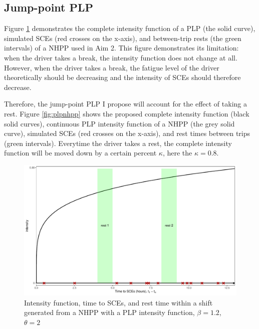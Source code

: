 \documentclass[12pt]{book}
\numberwithin{equation}{chapter}
\begin{document}
\hypertarget{jump-point-plp}{%
\subsection{Jump-point PLP}\label{jump-point-plp}}

Figure \ref{fig:plpjumppoint} demonstrates the complete intensity function of a PLP (the solid curve), simulated SCEs (red crosses on the x-axis), and between-trip rests (the green intervals) of a NHPP used in Aim 2. This figure demonstrates its limitation: when the driver takes a break, the intensity function does not change at all. However, when the driver takes a break, the fatigue level of the driver theoretically should be decreasing and the intensity of SCEs should therefore decrease.

Therefore, the jump-point PLP I propose will account for the effect of taking a rest. Figure \ref{fig:plpnhpp} shows the proposed complete intensity function (black solid curves), continuous PLP intensity function of a NHPP (the grey solid curve), simulated SCEs (red crosses on the x-axis), and rest times between trips (green intervals). Everytime the driver takes a rest, the complete intensity function will be moved down by a certain percent \(\kappa\), here the \(\kappa = 0.8\).

\begin{figure}[!ht]

{\centering \includegraphics[width=\linewidth]{figs/PLP_NHPP_intensity} 

}

\caption{Intensity function, time to SCEs, and rest time within a shift generated from a NHPP with a PLP intensity function, $\beta = 1.2$, $\theta=2$}\label{fig:plpjumppoint}
\end{figure}
\end{document}
